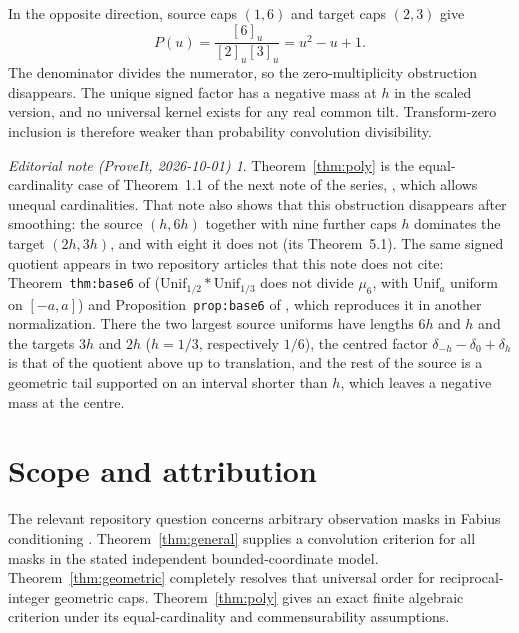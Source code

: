 \documentclass[11pt,a4paper]{article}
\theoremstyle{remark}\newtheorem*{ednote}{Editorial note (ProveIt, 2026-10-01)}
\begin{document}
In the opposite direction, source caps $(1,6)$ and target caps $(2,3)$ give
\[
 P(u)=\frac{[6]_u}{[2]_u[3]_u}=u^2-u+1.
\]
The denominator divides the numerator, so the zero-multiplicity obstruction disappears. The unique signed factor has a negative mass at $h$ in the scaled version, and no universal kernel exists for any real common tilt. Transform-zero inclusion is therefore weaker than probability convolution divisibility.
\begin{ednote}
Theorem~\ref{thm:poly} is the equal-cardinality case of Theorem~1.1 of the
next note of the series, ,
which allows unequal cardinalities. That note also shows that this obstruction
disappears after smoothing: the source $(h,6h)$ together with nine further
caps $h$ dominates the target $(2h,3h)$, and with eight it does not (its
Theorem~5.1). The same signed quotient appears in two repository articles that
this note does not cite: Theorem~\texttt{thm:base6} of
($\mathrm{Unif}_{1/2}*\mathrm{Unif}_{1/3}$ does not divide $\mu_6$, with
$\mathrm{Unif}_a$ uniform on $[-a,a]$) and Proposition~\texttt{prop:base6} of
,
which reproduces it in another normalization. There the two largest source
uniforms have lengths $6h$ and $h$ and the targets $3h$ and $2h$ ($h=1/3$,
respectively $1/6$), the centred factor $\delta_{-h}-\delta_0+\delta_h$ is
that of the quotient above up to translation, and the rest of the source is a
geometric tail supported on an interval shorter than $h$, which leaves a
negative mass at the centre.
\end{ednote}

\section{Scope and attribution}
The relevant repository question concerns arbitrary observation masks in Fabius conditioning \cite{Repository}. Theorem~\ref{thm:general} supplies a convolution criterion for all masks in the stated independent bounded-coordinate model. Theorem~\ref{thm:geometric} completely resolves that universal order for reciprocal-integer geometric caps. Theorem~\ref{thm:poly} gives an exact finite algebraic criterion under its equal-cardinality and commensurability assumptions.
\end{document}

